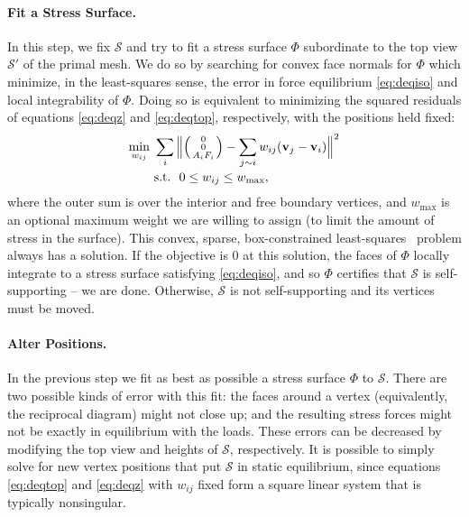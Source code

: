 \documentclass[annual]{acmsiggraph}
\makeatletter
\def\Forcevector{\Big(\mbox{\scriptsize
	\def\arraystretch{0.8}\begin{tabular}{@{\,}c@{\,}}
	0 \\ 0 \\ $A_i F_i$
	\end{tabular}}\Big)}
\def\SS{{\mathcal S}}
\makeatother
\begin{document}
\paragraph{Fit a Stress Surface.} In this step, we fix $\SS$ and try to
fit a stress surface $\Phi$ subordinate to the top view $\SS'$ of the
primal mesh. We do so by searching for convex face normals for $\Phi$
which minimize, in the least-squares sense, the error in force equilibrium
\eqref{eq:deqiso} and local integrability of $\Phi$. Doing so is
equivalent to minimizing the squared residuals of equations
\eqref{eq:deqz} and \eqref{eq:deqtop}, respectively, with the positions
held fixed:
	\begin{align}
	\min_{w_{ij}}\
	&
	\sum_i
	\Big\| \Forcevector -
		\sum_{j\sim i} w_{ij} (\vw_j-\vw_i) \Big\|^2
		\nonumber
	\\&
	\textrm{s.t.}\ \
		0 \leq w_{ij} \leq w_{\max}, \label{eq:wbounds}
\end{align}
 where the outer sum is over the interior and free boundary vertices, and
$w_\textrm{max}$ is an optional maximum weight we are willing to assign
(to limit the amount of stress in the surface). This convex, sparse,
box-constrained least-squares~\cite{BCLS} problem always has a solution. If the
objective is $0$ at this solution, the faces of $\Phi$ locally integrate
to a stress surface satisfying \eqref{eq:deqiso}, and so $\Phi$ certifies
that $\SS$ is self-supporting -- we are done. Otherwise, $\SS$ is not
self-supporting and its vertices must be moved.

\paragraph{Alter Positions.} In the previous step we fit as best as
possible a stress surface $\Phi$ to $\SS$. There are two possible kinds of
error with this fit: the faces around a vertex (equivalently, the
reciprocal diagram) might not close up; and the resulting stress forces
might not be exactly in equilibrium with the loads. These errors can be
decreased by modifying the top view and heights of $\SS$, respectively. It
is possible to simply solve for new vertex positions that put $\SS$ in
static equilibrium, since equations \eqref{eq:deqtop} and \eqref{eq:deqz}
with $w_{ij}$ fixed form a square linear system that is typically
nonsingular.
\end{document}
